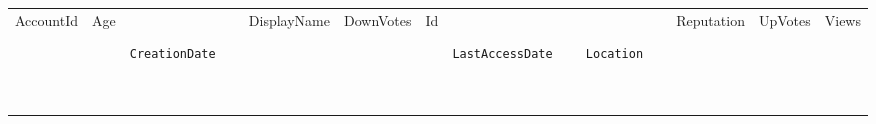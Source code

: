 \documentclass[12pt,a4paper,twoside,openright,titlepage,final]{article}
\begin{document}
\begin{enumerate}
	\begin{longtable}[]{@{}lllllllllll@{}}
		\label{tbl:menos_edad}\\
		\toprule
		\begin{minipage}[t]{0.06\columnwidth}\raggedright\strut
			AccountId
			\strut\end{minipage} &
		\begin{minipage}[t]{0.03\columnwidth}\raggedright\strut
			Age
			\strut\end{minipage} &
		\begin{minipage}[t]{0.12\columnwidth}\raggedright\strut
			\begin{verbatim}
			CreationDate
			\end{verbatim}
			\strut\end{minipage} &
		\begin{minipage}[t]{0.07\columnwidth}\raggedright\strut
			DisplayName
			\strut\end{minipage} &
		\begin{minipage}[t]{0.06\columnwidth}\raggedright\strut
			DownVotes
			\strut\end{minipage} &
		\begin{minipage}[t]{0.02\columnwidth}\raggedright\strut
			Id
			\strut\end{minipage} &
		\begin{minipage}[t]{0.12\columnwidth}\raggedright\strut
			\begin{verbatim}
			LastAccessDate
			\end{verbatim}
			\strut\end{minipage} &
		\begin{minipage}[t]{0.11\columnwidth}\raggedright\strut
			\begin{verbatim}
			Location
			\end{verbatim}
			\strut\end{minipage} &
		\begin{minipage}[t]{0.06\columnwidth}\raggedright\strut
			Reputation
			\strut\end{minipage} &
		\begin{minipage}[t]{0.04\columnwidth}\raggedright\strut
			UpVotes
			\strut\end{minipage} &
		\begin{minipage}[t]{0.04\columnwidth}\raggedright\strut
			Views
			\strut\end{minipage}\tabularnewline
		\begin{minipage}[t]{0.06\columnwidth}\raggedright\strut
			\begin{verbatim}

\end{verbatim}
\end{minipage}
\end{longtable}
\end{enumerate}
\end{document}
